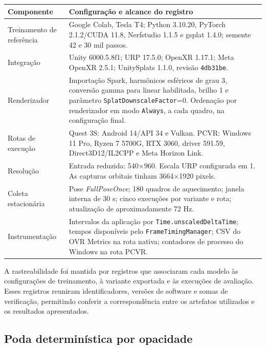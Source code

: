 \begin{quadro}[H]
\centering
\footnotesize
\caption{Configurações registradas para reprodução do estudo de caso.}
\label{qua:configuracao_experimental}
\renewcommand{\arraystretch}{1.15}
\begin{tabularx}{\textwidth}{|p{3.0cm}|>{\raggedright\arraybackslash}X|}
\hline
\textbf{Componente} & \textbf{Configuração e alcance do registro} \\ \hline
Treinamento de referência & Google Colab, Tesla T4; Python 3.10.20, PyTorch 2.1.2/CUDA 11.8, Nerfstudio 1.1.5 e gsplat 1.4.0; semente 42 e 30 mil passos. \\ \hline
Integração & Unity 6000.5.8f1; URP 17.5.0; OpenXR 1.17.1; Meta OpenXR 2.5.1; UnitySplats 1.1.0, revisão \texttt{4db31be}. \\ \hline
Renderizador & Importação Spark, harmônicos esféricos de grau 3, conversão gamma para linear habilitada, brilho 1 e parâmetro \texttt{SplatDownscaleFactor}=0. Ordenação por renderizador em modo \texttt{Always}, a cada quadro, na configuração final. \\ \hline
Rotas de execução & Quest 3S: Android 14/API 34 e Vulkan. PCVR: Windows 11 Pro, Ryzen 7 5700G, RTX 3060, driver 591.59, Direct3D12/IL2CPP e Meta Horizon Link. \\ \hline
Resolução & Entrada reduzida: 540$\times$960. Escala URP configurada em 1. As capturas orbitais tinham 3664$\times$1920 pixels. \\ \hline
Coleta estacionária & Pose \textit{FullPoseOnce}; 180 quadros de aquecimento; janela interna de 30 s; cinco execuções por variante e rota; atualização de aproximadamente 72 Hz. \\ \hline
Instrumentação & Intervalos da aplicação por \texttt{Time.unscaledDeltaTime}; tempos disponíveis pelo \texttt{FrameTimingManager}; CSV do OVR Metrics na rota nativa; contadores de processo do Windows na rota PCVR. \\ \hline
\end{tabularx}
\end{quadro}

A rastreabilidade foi mantida por registros que associaram cada modelo às configurações de treinamento, à variante exportada e às execuções de avaliação. Esses registros reuniram identificadores, versões de software e somas de verificação, permitindo conferir a correspondência entre os artefatos utilizados e os resultados apresentados.

\subsection{Poda determinística por opacidade}

